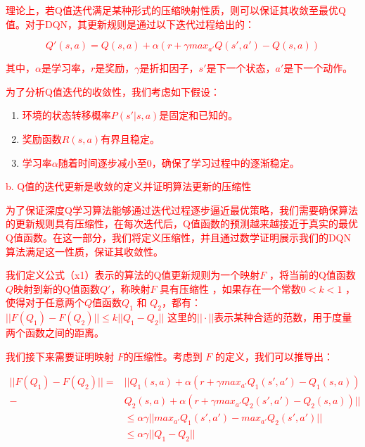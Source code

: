 \documentclass[preprint,12pt]{elsarticle}
\begin{document}
\textcolor{red}{理论上，若Q值迭代满足某种形式的压缩映射性质，则可以保证其收敛至最优Q值。对于DQN，其更新规则是通过以下迭代过程给出的：}

\textcolor{red}{
\begin{equation}
    Q' (s,a)=Q(s,a)+\alpha(r+\gamma max_{a'}Q(s',a')-Q(s,a))
\end{equation}
}

\textcolor{red}{其中，\(\alpha\)是学习率，\(r\)是奖励，\(\gamma\)是折扣因子，\(s'\)是下一个状态，\(a'\)是下一个动作。}

\textcolor{red}{为了分析Q值迭代的收敛性，我们考虑如下假设：}

\begin{enumerate}
    \item \textcolor{red}{环境的状态转移概率\(P(s'|s,a)\)是固定和已知的。}
    
    \item \textcolor{red}{奖励函数\(R(s,a)\)有界且稳定。}
    
    \item \textcolor{red}{学习率\(\alpha\)随着时间逐步减小至0，确保了学习过程中的逐渐稳定。}
\end{enumerate}

\textcolor{red}{b.  Q值的迭代更新是收敛的定义并证明算法更新的压缩性}

\textcolor{red}{为了保证深度Q学习算法能够通过迭代过程逐步逼近最优策略，我们需要确保算法的更新规则具有压缩性，在每次迭代后，Q值函数的预测越来越接近于真实的最优Q值函数。在这一部分，我们将定义压缩性，并且通过数学证明展示我们的DQN算法满足这一性质，保证其收敛性。}

\textcolor{red}{我们定义公式（x1）表示的算法的Q值更新规则为一个映射\(F\) ，将当前的Q值函数\(Q\)映射到新的Q值函数\(Q'\)，称映射\(F\) 具有压缩性 ，如果存在一个常数\(0<k<1\) ，使得对于任意两个\(Q\)值函数\(Q_1\) 和 \(Q_2\)，都有： 
\(||F(Q_1)-F(Q_2)||\leq k||Q_1-Q_2||\)
这里的\(||·||\)表示某种合适的范数，用于度量两个函数之间的距离。
}

\textcolor{red}{我们接下来需要证明映射 \(F\)的压缩性。考虑到 \(F\) 的定义，我们可以推导出：}

\textcolor{red}{
\begin{equation}
\begin{aligned}
    ||F(Q_1)-F(Q_2)||=&||Q_1(s,a)+\alpha(r+\gamma max_{a'}Q_1(s',a')-Q_1(s,a))\\-&Q_2(s,a)+ \alpha(r+\gamma max_{a'}Q_2(s',a')-Q_2(s,a))||\\
    &\leq\alpha\gamma ||max_{a'}Q_1(s',a')-max_{a'}Q_2(s',a')||\\
    &\leq \alpha \gamma ||Q_1-Q_2||
\end{aligned}
\end{equation}
}
\end{document}
